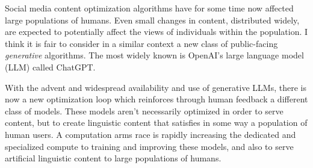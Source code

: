 \documentclass[11pt, oneside]{article}   	%
\begin{document}














Social media content optimization algorithms have for some time now affected large populations of humans.  Even small changes in content, distributed widely, are expected to potentially affect the views of individuals within the population.  I think it is fair to consider in a similar context a new class of public-facing \emph{generative} algorithms.  The most widely known is OpenAI's large language model (LLM) called ChatGPT.

With the advent and widespread availability and use of generative LLMs, there is now a new optimization loop which reinforces through human feedback a different class of models.  These models aren't necessarily optimized in order to serve content, but to create linguistic content that satisfies in some way a population of human users.  A computation arms race is rapidly increasing the dedicated and specialized compute to training and improving these models, and also to serve artificial linguistic content to large populations of humans.
\end{document}

